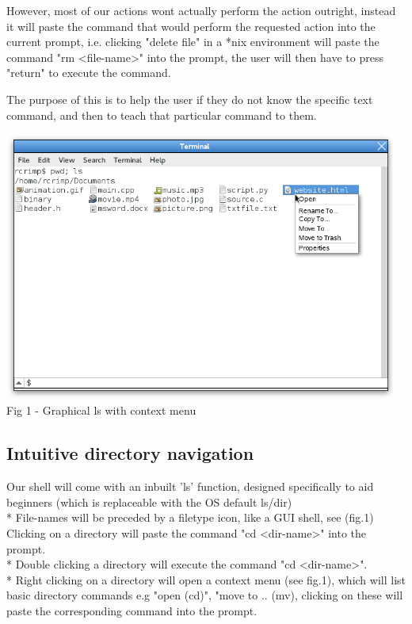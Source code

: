 \documentclass[a4paper,12pt]{article}
\begin{document}
However, most of our actions wont actually perform the action outright, instead it will paste the command that would perform the requested action into the current prompt, i.e. clicking "delete file" in a *nix environment will paste the command "rm \textless file-name\textgreater" into the prompt, the user will then have to press "return" to execute the command.

The purpose of this is to help the user if they do not know the specific text command, and then to teach that particular command to them.

\begin{center}
  \includegraphics[width=13cm]{context2.png}\\
  \small Fig 1 - Graphical ls with context menu
\end{center}
\subsection*{Intuitive directory navigation}
Our shell will come with an inbuilt 'ls' function, designed specifically to aid beginners
(which is replaceable with the OS default ls/dir)\\*
File-names will be preceded by a filetype icon, like a GUI shell, see (fig.1)\\

Clicking on a directory will paste the command "cd \textless dir-name\textgreater" into the prompt.\\*
Double clicking a directory will execute the command "cd \textless dir-name\textgreater".\\*
Right clicking on a directory will open a context menu (see fig.1), which will list basic directory commands e.g "open (cd)", "move to .. (mv), clicking on these will paste the corresponding command into the prompt.
\end{document}
